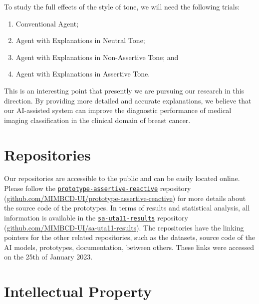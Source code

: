 \vspace{1.5mm}

\noindent
To study the full effects of the style of tone, we will need the following trials:

\vspace{0.05mm}

\begin{enumerate}
\item Conventional Agent;
\item Agent with Explanations in Neutral Tone;
\item Agent with Explanations in Non-Assertive Tone; and
\item Agent with Explanations in Assertive Tone.
\end{enumerate}

\vspace{0.5mm}

This is an interesting point that presently we are pursuing our research in this direction.
By providing more detailed and accurate explanations, we believe that our \ac{AI}-assisted system can improve the diagnostic performance of medical imaging classification in the clinical domain of breast cancer.

\section{Repositories}
\label{sec:app001sec010}

Our repositories are accessible to the public and can be easily located online.
Please follow the \texttt{\href{https://github.com/MIMBCD-UI/prototype-assertive-reactive}{prototype-assertive-reactive}} repository (\href{https://github.com/MIMBCD-UI/prototype-assertive-reactive}{github.com/MIMBCD-UI/prototype-assertive-reactive}) for more details about the source code of the prototypes.
In terms of results and statistical analysis, all information is available in the \texttt{\href{https://github.com/MIMBCD-UI/sa-uta11-results}{sa-uta11-results}} repository (\href{https://github.com/MIMBCD-UI/sa-uta11-results}{github.com/MIMBCD-UI/sa-uta11-results}).
The repositories have the linking pointers for the other related repositories, such as the datasets, source code of the \ac{AI} models, prototypes, documentation, between others.
These links were accessed on the 25th of January 2023.

\section{Intellectual Property}
\label{sec:app001sec011}

